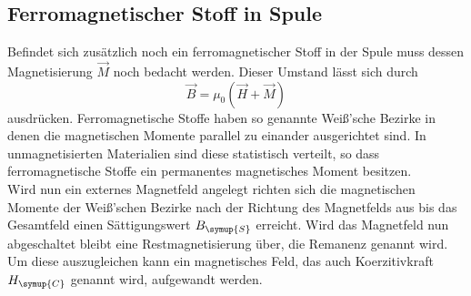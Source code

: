 \subsection{Ferromagnetischer Stoff in Spule}
\label{sec:ferromag}
Befindet sich zusätzlich noch ein ferromagnetischer Stoff in der Spule muss dessen Magnetisierung $\vec{M}$
noch bedacht werden. Dieser Umstand lässt sich durch
\begin{equation}
    \vec{B} = \mu_0 (\vec{H} + \vec{M})
\end{equation}
ausdrücken. Ferromagnetische Stoffe haben so genannte Weiß'sche Bezirke in denen die magnetischen
Momente parallel zu einander ausgerichtet sind. In unmagnetisierten Materialien sind diese statistisch verteilt,
so dass ferromagnetische Stoffe ein permanentes magnetisches Moment besitzen.\\
Wird nun ein externes Magnetfeld angelegt richten sich die magnetischen Momente der Weiß'schen Bezirke
nach der Richtung des Magnetfelds aus bis das Gesamtfeld einen Sättigungswert
$B_{\symup{S}}$ erreicht. Wird das Magnetfeld nun abgeschaltet bleibt eine Restmagnetisierung
über, die Remanenz genannt wird. Um diese auszugleichen kann ein magnetisches Feld, das
auch Koerzitivkraft $H_{\symup{C}}$ genannt wird, aufgewandt werden. 